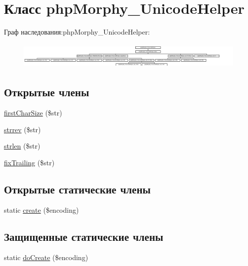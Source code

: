 \hypertarget{classphpMorphy__UnicodeHelper}{
\section{Класс phpMorphy\_\-UnicodeHelper}
\label{classphpMorphy__UnicodeHelper}
}
Граф наследования:phpMorphy\_\-UnicodeHelper:\begin{figure}[H]
\begin{center}
\leavevmode
\includegraphics[height=1.315789cm]{classphpMorphy__UnicodeHelper}
\end{center}
\end{figure}
\subsection*{Открытые члены}
\begin{DoxyCompactItemize}
\item 
\hyperlink{classphpMorphy__UnicodeHelper_a43c6ff5dc83daaa1d9cef12e3250f2c5}{firstCharSize} (\$str)
\item 
\hyperlink{classphpMorphy__UnicodeHelper_a0802c954bf8d6866fe85729ce8ef2df5}{strrev} (\$str)
\item 
\hyperlink{classphpMorphy__UnicodeHelper_ae8f19dea596da693c343df0f2d416acf}{strlen} (\$str)
\item 
\hyperlink{classphpMorphy__UnicodeHelper_a9734660369e07a3b5a0f1572ff0a0ae0}{fixTrailing} (\$str)
\end{DoxyCompactItemize}
\subsection*{Открытые статические члены}
\begin{DoxyCompactItemize}
\item 
static \hyperlink{classphpMorphy__UnicodeHelper_a87737cb9e16657db329f37660e47f20c}{create} (\$encoding)
\end{DoxyCompactItemize}
\subsection*{Защищенные статические члены}
\begin{DoxyCompactItemize}
\item 
static \hyperlink{classphpMorphy__UnicodeHelper_a62a9b832056bb7b3ec9358ec78151243}{doCreate} (\$encoding)
\end{DoxyCompactItemize}
